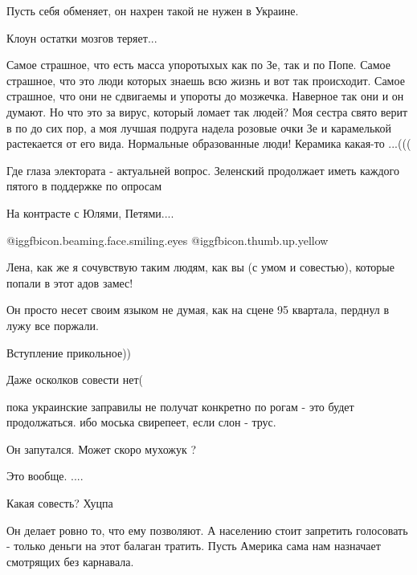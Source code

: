 \begin{itemize}
Пусть себя обменяет, он нахрен такой не нужен в Украине.

Клоун остатки мозгов теряет...


Самое страшное, что есть масса упоротыхых как по Зе, так и по Попе. Самое
страшное, что это люди которых знаешь всю жизнь и вот так происходит. Самое
страшное, что они не сдвигаемы и упороты до мозжечка. Наверное так они и он
думают. Но что это за вирус, который ломает так людей? Моя сестра свято верит в
по до сих пор, а моя лучшая подруга надела розовые очки Зе и карамелькой
растекается от его вида. Нормальные образованные люди! Керамика какая-то ...(((

Где глаза электората - актуальней вопрос.
Зеленский продолжает иметь каждого пятого в поддержке по опросам

\begin{itemize} %
На контрасте с Юлями, Петями....
\end{itemize} %

 @igg{fbicon.beaming.face.smiling.eyes}  @igg{fbicon.thumb.up.yellow} 

Лена, как же я сочувствую таким людям, как вы (с умом и совестью), которые попали в этот адов замес!

Он просто несет своим языком не думая, как на сцене 95 квартала, перднул в лужу все поржали.

Вступление прикольное))

Даже осколков совести нет(

пока украинские заправилы не получат конкретно по рогам - это будет продолжаться. ибо моська свирепеет, если слон - трус.

Он запутался. Может скоро мухожук ?

Это вообще. ....

Какая совесть?
Хуцпа


Он делает ровно то, что ему позволяют. А населению стоит запретить голосовать -
только деньги на этот балаган тратить. Пусть Америка сама нам назначает
смотрящих без карнавала.



\end{itemize}
